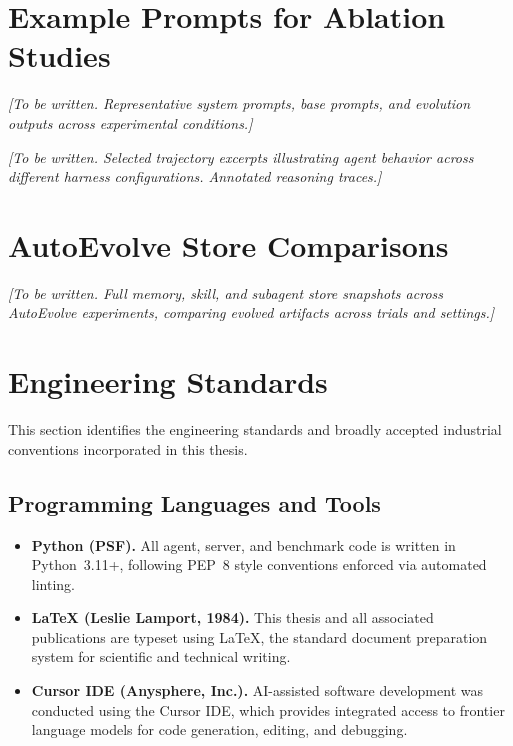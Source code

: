 \section{Example Prompts for Ablation Studies}\label{sec:appendix_prompts}

\textit{[To be written. Representative system prompts, base prompts, and evolution outputs across experimental conditions.]}


\textit{[To be written. Selected trajectory excerpts illustrating agent behavior across different harness configurations. Annotated reasoning traces.]}

\section{AutoEvolve Store Comparisons}\label{sec:appendix_stores}

\textit{[To be written. Full memory, skill, and subagent store snapshots across AutoEvolve experiments, comparing evolved artifacts across trials and settings.]}

\section{Engineering Standards}\label{sec:appendix_engineering_standards}

This section identifies the engineering standards and broadly accepted industrial conventions incorporated in this thesis.

\subsection{Programming Languages and Tools}

\begin{itemize}[nosep]
\item \textbf{Python (PSF).} All agent, server, and benchmark code is written in Python~3.11+, following PEP~8 style conventions enforced via automated linting.
\item \textbf{\LaTeX{} (Leslie Lamport, 1984).} This thesis and all associated publications are typeset using \LaTeX{}, the standard document preparation system for scientific and technical writing.
\item \textbf{Cursor IDE (Anysphere, Inc.).} AI-assisted software development was conducted using the Cursor IDE, which provides integrated access to frontier language models for code generation, editing, and debugging.
\end{itemize}

